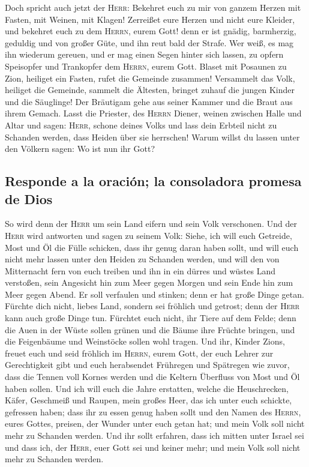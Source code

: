  Doch spricht auch jetzt der \textsc{Herr}: Bekehret euch
zu mir von ganzem Herzen mit Fasten, mit Weinen, mit Klagen!
 Zerreißet eure Herzen und nicht eure Kleider, und
bekehret euch zu dem \textsc{Herrn}, eurem Gott! denn er ist gnädig,
barmherzig, geduldig und von großer Güte, und ihn reut bald der Strafe.
 Wer weiß, es mag ihn wiederum gereuen, und er mag einen
Segen hinter sich lassen, zu opfern Speisopfer und Trankopfer dem
\textsc{Herrn}, eurem Gott.  Blaset mit Posaunen zu Zion,
heiliget ein Fasten, rufet die Gemeinde zusammen! 
Versammelt das Volk, heiliget die Gemeinde, sammelt die Ältesten,
bringet zuhauf die jungen Kinder und die Säuglinge! Der Bräutigam gehe
aus seiner Kammer und die Braut aus ihrem Gemach.  Lasst
die Priester, des \textsc{Herrn} Diener, weinen zwischen Halle und Altar
und sagen: \textsc{Herr}, schone deines Volks und lass dein Erbteil
nicht zu Schanden werden, dass Heiden über sie herrschen! Warum willst
du lassen unter den Völkern sagen: Wo ist nun ihr Gott?

\hypertarget{responde-a-la-oraciuxf3n-la-consoladora-promesa-de-dios}{%
\subsection{Responde a la oración; la consoladora promesa de
Dios}\label{responde-a-la-oraciuxf3n-la-consoladora-promesa-de-dios}}

 So wird denn der \textsc{Herr} um sein Land eifern und
sein Volk verschonen.  Und der \textsc{Herr} wird
antworten und sagen zu seinem Volk: Siehe, ich will euch Getreide, Most
und Öl die Fülle schicken, dass ihr genug daran haben sollt, und will
euch nicht mehr lassen unter den Heiden zu Schanden werden,
 und will den von Mitternacht fern von euch treiben und
ihn in ein dürres und wüstes Land verstoßen, sein Angesicht hin zum Meer
gegen Morgen und sein Ende hin zum Meer gegen Abend. Er soll verfaulen
und stinken; denn er hat große Dinge getan.  Fürchte dich
nicht, liebes Land, sondern sei fröhlich und getrost; denn der
\textsc{Herr} kann auch große Dinge tun.  Fürchtet euch
nicht, ihr Tiere auf dem Felde; denn die Auen in der Wüste sollen grünen
und die Bäume ihre Früchte bringen, und die Feigenbäume und Weinstöcke
sollen wohl tragen.  Und ihr, Kinder Zions, freuet euch
und seid fröhlich im \textsc{Herrn}, eurem Gott, der euch Lehrer zur
Gerechtigkeit gibt und euch herabsendet Frühregen und Spätregen wie
zuvor,  dass die Tennen voll Kornes werden und die
Keltern Überfluss von Most und Öl haben sollen.  Und ich
will euch die Jahre erstatten, welche die Heuschrecken, Käfer, Geschmeiß
und Raupen, mein großes Heer, das ich unter euch schickte, gefressen
haben;  dass ihr zu essen genug haben sollt und den Namen
des \textsc{Herrn}, eures Gottes, preisen, der Wunder unter euch getan
hat; und mein Volk soll nicht mehr zu Schanden werden. 
Und ihr sollt erfahren, dass ich mitten unter Israel sei und dass ich,
der \textsc{Herr}, euer Gott sei und keiner mehr; und mein Volk soll
nicht mehr zu Schanden werden.

